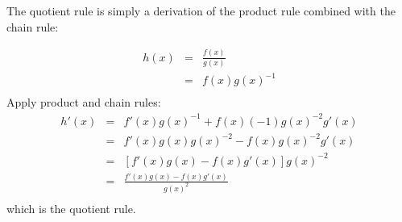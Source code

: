 \documentclass[12pt]{article}
\begin{document}
The quotient rule is simply a derivation of the product rule combined with the chain rule:

\begin{eqnarray*}
h(x) &=& \frac{f(x)}{g(x)} \\
&=& f(x)g(x)^{-1} \\
\end{eqnarray*}
Apply product and chain rules:
\begin{eqnarray*}
h'(x) &=& f'(x)g(x)^{-1} + f(x)(-1)g(x)^{-2}g'(x) \\
&=& f'(x)g(x)g(x)^{-2} - f(x)g(x)^{-2}g'(x) \\
&=& [f'(x)g(x) - f(x)g'(x)]g(x)^{-2} \\
&=& \frac{f'(x)g(x) - f(x)g'(x)}{g(x)^2} \\
\end{eqnarray*}
which is the quotient rule.
\end{document}
